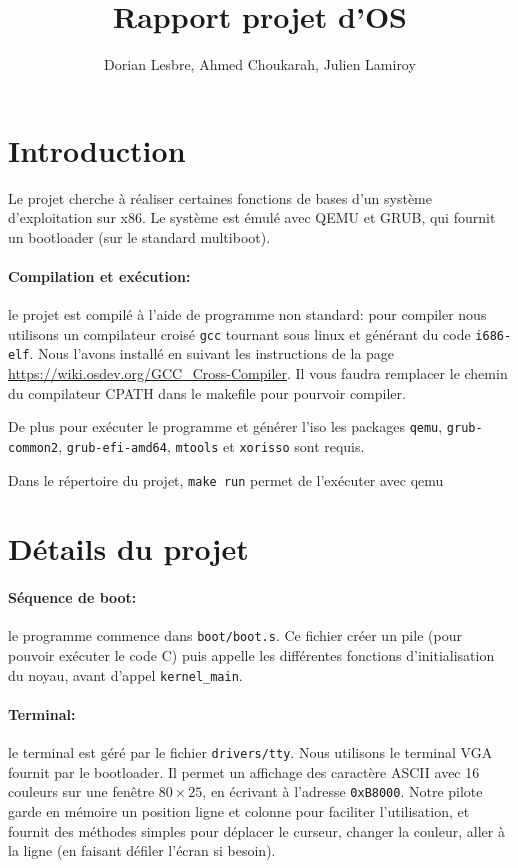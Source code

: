 \documentclass[12pt,a4paper]{article}
\title{Rapport projet d'OS}
\date{}
\author{Dorian Lesbre, Ahmed Choukarah, Julien Lamiroy}
\begin{document}
\maketitle

\section{Introduction}

Le projet cherche à réaliser certaines fonctions de bases d'un système d'exploitation sur x86. Le système est émulé avec QEMU et GRUB, qui fournit un bootloader (sur le standard multiboot).

\paragraph{Compilation et exécution:} le projet est compilé à l'aide de programme non standard: pour compiler nous utilisons un compilateur croisé \texttt{gcc} tournant sous linux et générant du code 
\texttt{i686-elf}.
Nous l'avons installé en suivant les instructions de la page \url{https://wiki.osdev.org/GCC_Cross-Compiler}. Il vous faudra remplacer le chemin du compilateur CPATH dans le makefile pour pourvoir compiler.


De plus pour exécuter le programme et générer l'iso les packages \texttt{qemu}, \texttt{grub-common2}, \texttt{grub-efi-amd64}, \texttt{mtools} et \texttt{xorisso} sont requis.


Dans le répertoire du projet, \texttt{make run} permet de l'exécuter avec qemu

\section{Détails du projet}

\paragraph{Séquence de boot:} le programme commence dans \texttt{boot/boot.s}. Ce fichier créer un pile (pour pouvoir exécuter le code C) puis appelle les différentes fonctions d'initialisation du noyau, avant d'appel \texttt{kernel\_main}.

\paragraph{Terminal:} le terminal est géré par le fichier \texttt{drivers/tty}. Nous utilisons le terminal VGA fournit par le bootloader. Il permet un affichage des caractère ASCII avec 16 couleurs sur une fenêtre $80 \times 25$, en écrivant à l'adresse \texttt{0xB8000}. Notre pilote garde en mémoire un position ligne et colonne pour faciliter l'utilisation, et fournit des méthodes simples pour déplacer le curseur, changer la couleur, aller à la ligne (en faisant défiler l'écran si besoin).
\end{document}
